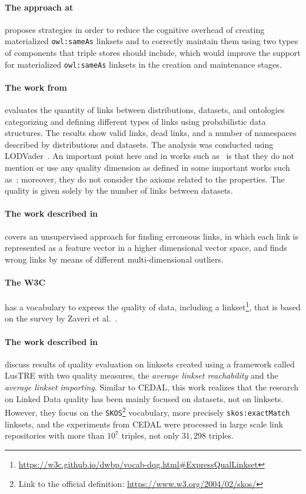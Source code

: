 \paragraph{The approach at~\cite{casanova2014materialized}} proposes strategies in order to reduce the cognitive overhead of creating materialized \texttt{owl:sameAs} linksets and to correctly maintain them using two types of components that triple stores should include, which would improve the support for materialized \texttt{owl:sameAs} linksets in the creation and maintenance stages.

\paragraph{The work from \cite{netoassessing}} evaluates the quantity of links between distributions, datasets, and ontologies categorizing and defining different types of links using probabilistic data structures.
	The results show valid links, dead links, and a number of namespaces described by distributions and datasets. The analysis was conducted using LODVader~\cite{baron2016lodvader}.
	An important point here and in works such as~\cite{scharffe2009rdf,beek2014lod,makela2014aether} is that they do not mention or use any quality dimension as defined in some important works such as~\cite{zaveri2015quality,albertoni2015linkset}; moreover, they do not consider the axioms related to the properties. The quality is given solely by the number of links between datasets.

\paragraph{The work described in~\cite{paulheim2014identifying}} covers an unsupervised approach for finding erroneous links, in which each link is represented as a feature vector in a higher dimensional vector space, and finds wrong links by means of different multi-dimensional outliers.

\paragraph{The W3C} has a vocabulary to express the quality of data, including a linkset\footnote{\url{https://w3c.github.io/dwbp/vocab-dqg.html\#ExpressQualLinkset}}, that is based on the survey by Zaveri et al.~\cite{zaveri2015quality}.
	
\paragraph{The work described in~\cite{albertoni2016linkset}} discuss results of quality evaluation on linksets created using a framework called LusTRE with two quality measures, the \textit{average linkset reachability} and the \textit{average linkset importing}. 
    Similar to CEDAL, this work realizes that the research on Linked Data quality has been mainly focused on datasets, not on linksets.
	However, they focus on the \texttt{SKOS}\footnote{Link to the official definition: \url{https://www.w3.org/2004/02/skos/}} vocabulary, more precisely \texttt{skos:exactMatch} linksets, and the experiments from CEDAL were processed in large scale link repositories with more than $10^7$ triples, not only $31,298$ triples. 
